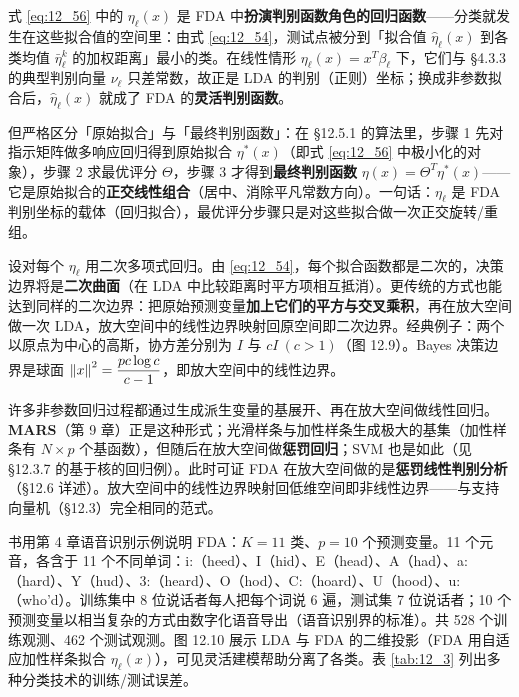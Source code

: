 \begin{remark}
式 \ref{eq:12_56} 中的 $\eta_\ell(x)$ 是 FDA 中\textbf{扮演判别函数角色的回归函数}——分类就发生在这些拟合值的空间里：由式 \ref{eq:12_54}，测试点被分到「拟合值 $\hat\eta_\ell(x)$ 到各类均值 $\bar\eta_\ell^k$ 的加权距离」最小的类。在线性情形 $\eta_\ell(x)=x^T\beta_\ell$ 下，它们与 §4.3.3 的典型判别向量 $\nu_\ell$ 只差常数，故正是 LDA 的判别（正则）坐标；换成非参数拟合后，$\hat\eta_\ell(x)$ 就成了 FDA 的\textbf{灵活判别函数}。

但严格区分「原始拟合」与「最终判别函数」：在 §12.5.1 的算法里，步骤 1 先对指示矩阵做多响应回归得到原始拟合 $\eta^*(x)$（即式 \ref{eq:12_56} 中极小化的对象），步骤 2 求最优评分 $\Theta$，步骤 3 才得到\textbf{最终判别函数} $\eta(x)=\Theta^T\eta^*(x)$——它是原始拟合的\textbf{正交线性组合}（居中、消除平凡常数方向）。一句话：$\eta_\ell$ 是 FDA 判别坐标的载体（回归拟合），最优评分步骤只是对这些拟合做一次正交旋转/重组。
\end{remark}

\begin{example}
设对每个 $\eta_\ell$ 用二次多项式回归。由 \ref{eq:12_54}，每个拟合函数都是二次的，决策边界将是\textbf{二次曲面}（在 LDA 中比较距离时平方项相互抵消）。更传统的方式也能达到同样的二次边界：把原始预测变量\textbf{加上它们的平方与交叉乘积}，再在放大空间做一次 LDA，放大空间中的线性边界映射回原空间即二次边界。经典例子：两个以原点为中心的高斯，协方差分别为 $I$ 与 $cI\ (c>1)$（图 12.9）。Bayes 决策边界是球面 $\left\lVert x\right\rVert^2 = \dfrac{pc\log c}{c-1}$，即放大空间中的线性边界。
\end{example}

许多非参数回归过程都通过生成派生变量的基展开、再在放大空间做线性回归。\textbf{MARS}（第 9 章）正是这种形式；光滑样条与加性样条生成极大的基集（加性样条有 $N\times p$ 个基函数），但随后在放大空间做\textbf{惩罚回归}；SVM 也是如此（见 §12.3.7 的基于核的回归例）。此时可证 FDA 在放大空间做的是\textbf{惩罚线性判别分析}（§12.6 详述）。放大空间中的线性边界映射回低维空间即非线性边界——与支持向量机（§12.3）完全相同的范式。

\begin{remark}[语音识别示例]
书用第 4 章语音识别示例说明 FDA：$K=11$ 类、$p=10$ 个预测变量。11 个元音，各含于 11 个不同单词：i:（heed）、I（hid）、E（head）、A（had）、a:（hard）、Y（hud）、3:（heard）、O（hod）、C:（hoard）、U（hood）、u:（who'd）。训练集中 8 位说话者每人把每个词说 6 遍，测试集 7 位说话者；10 个预测变量以相当复杂的方式由数字化语音导出（语音识别界的标准）。共 528 个训练观测、462 个测试观测。图 12.10 展示 LDA 与 FDA 的二维投影（FDA 用自适应加性样条拟合 $\eta_\ell(x)$），可见灵活建模帮助分离了各类。表 \ref{tab:12_3} 列出多种分类技术的训练/测试误差。
\end{remark}

